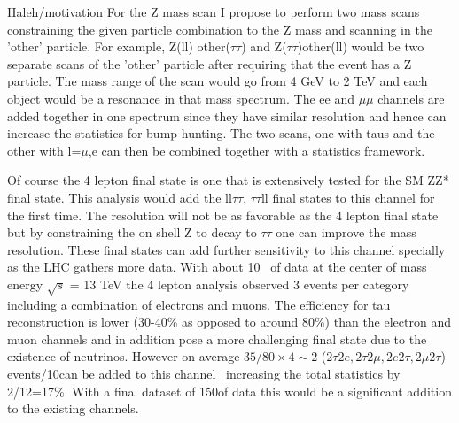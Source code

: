\newcommand{\pt}{\mbox{$p_T$}}
 {Haleh/motivation} 
For the Z mass scan I propose to perform two mass scans constraining the given particle combination to the Z mass and scanning in the 'other' particle. 
For example, Z(ll) other($\tau\tau$) and Z($\tau\tau$)other(ll) would be two separate scans of the 'other' particle after requiring that the event has a Z particle. 
The mass range of the scan would go from 4 GeV to 2 TeV and each object would be a resonance in that mass spectrum. The ee and $\mu\mu$ channels are added together 
in one spectrum since they have similar resolution and hence can increase the statistics for bump-hunting.  
The two scans, one with taus and the other with l=$\mu$,e  can then be combined together with a statistics framework.  

Of course the 4 lepton final state is one that is extensively tested for the SM ZZ* final state. This analysis would add the ll$\tau\tau$, $\tau\tau$ll final states to this channel for the first time.  The resolution will not be as favorable as
the 4 lepton final state but by constraining the on shell Z to decay to $\tau \tau$ one can improve the mass resolution.  These final states can add further sensitivity to this channel specially as the LHC
gathers more data.  With about 10 \invfb\ of data at the center of mass energy $\sqrt s$ = 13 TeV the 4 lepton analysis observed 3 events per category including a combination of electrons and muons.  The efficiency for tau reconstruction is lower (30-40\% as opposed to around 80\%) than the electron and muon channels and in 
addition pose a more challenging final state due to the existence of neutrinos.
However on average $35/80\times4\sim 2$ ($2\tau2e, 2\tau2\mu, 2e2\tau,2\mu2\tau$) events/10\invfb can be added to this channel~\cite{2016:4l} increasing the total statistics by 2/12=17\%. With a final dataset of 150\invfb of data this would be a significant addition to the existing channels.



